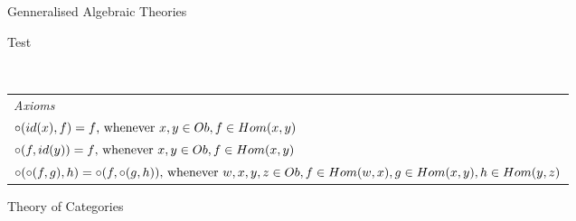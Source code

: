 \newcommand{\ofOb}[1]{\ofT{#1}{\Ob}}
\newcommand{\ofHom}[2]{\ofT{#1}{\Hom(#2)}}


\begin{frame}{Genneralised Algebraic Theories}







\end{frame}
\begin{frame}{Test}
 \\
\vspace{.1cm}  

\begin{tabular}{l}
\itshape{Axioms} \\
$\circ(id(x),f)=f \mbox{,  whenever\ } \ofOb{x,y},\ofHom{f}{x,y}  $\\
$\circ(f,id(y))=f \mbox{,  whenever\ } \ofOb{x,y},\ofHom{f}{x,y}  $\\
$ \circ(\circ(f,g),h) = \circ(f,\circ(g,h))  \mbox{,  whenever\ } \ofOb{w,x,y,z}, \ofHom{f}{w,x}, \ofHom{g}{x,y}, \ofHom{h}{y,z}$
\end{tabular}
\end{frame}

\begin{frame}{Theory of Categories}
\footnotesize

\end{frame}